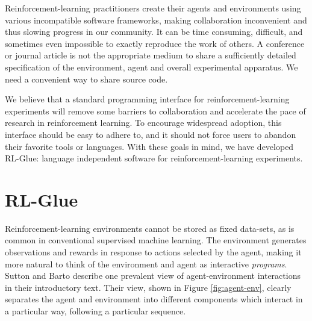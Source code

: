 \documentclass[twoside,11pt]{article}
\begin{document}
Reinforcement-learning practitioners create their agents and environments using various incompatible software frameworks, making collaboration inconvenient and thus slowing progress in our community.  It can be time consuming, difficult, and sometimes even impossible to exactly reproduce the work of others.  A conference or journal article is not the appropriate medium to share a sufficiently detailed specification of the environment, agent and overall experimental apparatus.  We need a convenient way to share source code.

%
%
We believe that a standard programming interface for reinforcement-learning experiments will remove some barriers to collaboration and accelerate the pace of research in reinforcement learning.  To encourage widespread adoption, this interface should be easy to adhere to, and it should not force users to abandon their favorite tools or languages.  With these goals in mind, we have developed RL-Glue: language independent software for reinforcement-learning experiments.


\section{RL-Glue}
Reinforcement-learning environments cannot be stored as fixed data-sets, as is common in conventional supervised machine learning.  The environment generates observations and rewards in response to actions selected by the agent, making it more natural to think of the environment and agent as interactive \textit{programs}.  Sutton and Barto describe one prevalent view of agent-environment interactions in their introductory text\citep{rlbook}.  Their view, shown in Figure \ref{fig:agent-env}, clearly separates the agent and environment into different components which interact in a particular way, following a particular sequence.   
\end{document}
